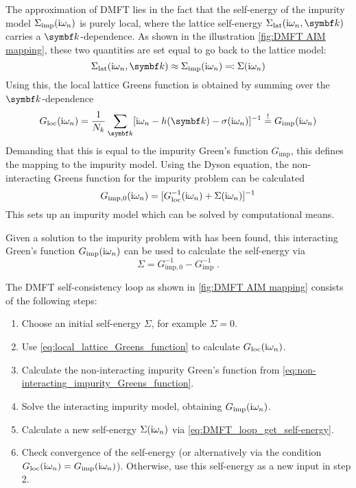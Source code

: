 \documentclass[../notes.tex]{subfiles}
\begin{document}
The approximation of DMFT lies in the fact that the self-energy of the impurity model \(\Sigma_{\mathrm{imp}} (\mathrm{i} \omega_n)\) is purely local, where the lattice self-energy \(\Sigma_{\mathrm{lat}} (\iu \omega_n, \vb{k})\) carries a \(\vb{k}\)-dependence.
As shown in the illustration \cref{fig:DMFT AIM mapping}, these two quantities are set equal to go back to the lattice model:
\begin{equation}
	\Sigma_{\mathrm{lat}} (\iu \omega_n, \vb{k}) \approx \Sigma_{\mathrm{imp}} (\iu \omega_n) \eqcolon \Sigma (\iu \omega_n)
\end{equation}
Using this, the local lattice Greens function is obtained by summing over the \(\vb{k}\)-dependence
\begin{equation}
	G_{\mathrm{loc}} (\iu \omega_n) = \frac{1}{N_k} \sum_{\vb{k}} [\iu \omega_n - h(\vb{k}) - \sigma (\iu \omega_n)]^{-1} \overset{!}{=} G_{\mathrm{imp}} (\iu \omega_n)
	\label{eq:local_lattice_Greens_function}
\end{equation}
Demanding that this is equal to the impurity Green's function \(G_{\mathrm{imp}}\), this defines the mapping to the impurity model.
Using the Dyson equation, the non-interacting Greens function for the impurity problem can be calculated
\begin{equation}
	G_{\mathrm{imp}, 0} (\mathrm{i} \omega_n) = [G_{\mathrm{loc}}^{-1} (\mathrm{i} \omega_n) + \Sigma (\mathrm{i} \omega_n)]^{-1}
	\label{eq:non-interacting_impurity_Greens_function}
\end{equation}
This sets up an impurity model which can be solved by computational means.

Given a solution to the impurity problem with has been found, this interacting Green's function \(G_{\mathrm{imp}} (\mathrm{i} \omega_n)\) can be used to calculate the self-energy via
\begin{equation}
	\Sigma = G_{\mathrm{imp},0}^{-1} - G_{\mathrm{imp}}^{-1} \;.
	\label{eq:DMFT_loop_get_self-energy}
\end{equation}

The DMFT self-consistency loop as shown in \cref{fig:DMFT AIM mapping} consists of the following steps:
\begin{enumerate}
	\item Choose an initial self-energy \(\Sigma\), for example \(\Sigma = 0\).
	\item Use \cref{eq:local_lattice_Greens_function} to calculate \(G_{\mathrm{loc}} (\mathrm{i} \omega_n)\).
	\item Calculate the non-interacting impurity Green's function from \cref{eq:non-interacting_impurity_Greens_function}.
	\item Solve the interacting impurity model, obtaining \(G_{\mathrm{imp}} (\mathrm{i} \omega_n)\).
	\item Calculate a new self-energy \(\Sigma (\mathrm{i} \omega_n)\) via \cref{eq:DMFT_loop_get_self-energy}.
	\item Check convergence of the self-energy (or alternatively via the condition \(G_{\mathrm{loc}} (\mathrm{i} \omega_n) = G_{\mathrm{imp}} (\mathrm{i} \omega_n)\)). Otherwise, use this self-energy as a new input in step 2.
\end{enumerate}
\end{document}
